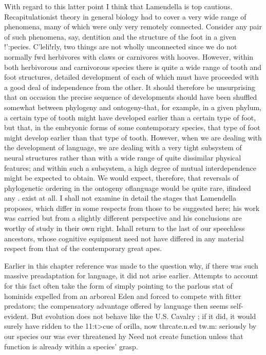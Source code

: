 With regard to this latter point I think that Lamendella is top cautious. Recapitulationist theory in general biology had to cover a very wide range of phenomena, many of which were only very re\-motely connected. Consider any pair of such phenomena, say, dentition and the structure of the foot in a given !':pecies. C'leli!rly, two things are not wholly unconnected since we do not normally fwd herbivores with claws or carnivores with hooves. However, within both herbivorous and carnivorous species there is quite a wide range of tooth and foot structures, detailed development of each of which must have proceeded with a good deal of independence from the other. It should therefore be unsurprising that on occasion the precise sequence of developments should have been shuffled somewhat between phylogeny and ontogeny{}-that, for example, in a given phylum, a certain type of tooth might have developed earlier than a certain type of foot, but that, in the embryonic forms of some contemporary species, that type
of foot might develop earlier than that type of tooth. However, when we are dealing with the development of language, we are dealing with a very tight subsystem of neural structures rather than with a wide range of quite dissimilar physical features; and within such a sub\-system, a high degree of mutual interdependence might be expected to obtain. We would expect, therefore, that reversals of phylogenetic
ordering in the ontogeny oflanguage would be quite rare, ifindeed any . exist at all.
I shall not examine in detail the stages that Lamendella proposes, which differ in some respects from those to be suggested here; his work was carried but from a slightly different perspective and his conclusions are worthy of study in their own right. Ishall return to the last of our speechless ancestors, whose cognitive equipment need not have differed in any material respect from that of the contemporary great apes.

Earlier in this chapter reference was made to the question why, if there was such massive preadaptation for language, it did not arise earlier. Attempts to account for this fact often take the form of simply pointing to the parlous stat of hominids expelled from an arboreal Eden and forced to compete with fitter predators; the compensatory advantage offered by language then seems self-evident. But evolution does not behave like the U.S. Cavalry ; if it did, it would surely have ridden to the 11:t{\textgreater}cue of orilla, now thrcate.n.ed tw.m: seriously by our species our was ever threatened hy Need
not create function unless that function is already within a species' grasp.

